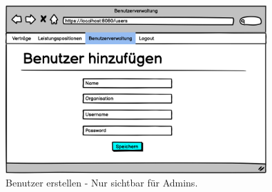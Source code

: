 \begin{figure}[h]
\centering
\includegraphics[width=10cm]{img/mockup_web/admin-nutzer-erstellung.png}
\caption{Benutzer erstellen - Nur sichtbar für Admins.}
\end{figure}